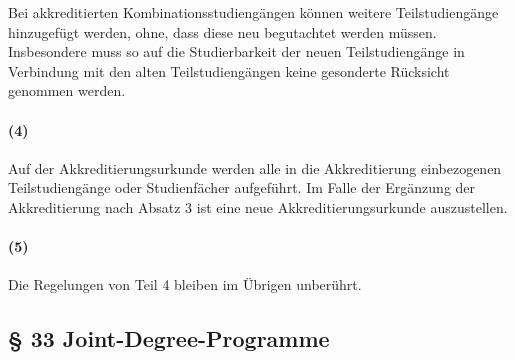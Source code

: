 \documentclass[a4paper]{scrartcl}
\begin{document}
\textcolor{Bernd}{\textbf{\cite{POS: WiSe2017-AkkRL}} Bei akkreditierten Kombinationsstudiengängen können weitere Teilstudiengänge hinzugefügt werden, ohne, dass diese neu begutachtet werden müssen. Insbesondere muss so auf die Studierbarkeit der neuen Teilstudiengänge in Verbindung mit den alten Teilstudiengängen keine gesonderte Rücksicht genommen werden. }

\paragraph{(4)} Auf der Akkreditierungsurkunde werden alle in die Akkreditierung einbezogenen Teilstudiengänge oder Studienfächer aufgeführt. Im Falle der Ergänzung der Akkreditierung nach Absatz 3 ist eine neue Akkreditierungsurkunde auszustellen.
\paragraph{(5)} Die Regelungen von Teil 4 bleiben im Übrigen unberührt.\\


\subsection{§ 33 Joint-Degree-Programme}
\end{document}
